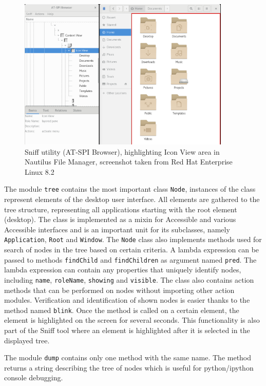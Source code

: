 \begin{figure}[h]
	\centering
	\includegraphics[width=0.9\textwidth]{obrazky-figures/sniff.png}
	\caption{Sniff utility (AT-SPI Browser), highlighting Icon View area in Nautilus File Manager, screenshot taken from Red Hat Enterprise Linux 8.2}
	\label{sniff}
\end{figure}

The module \texttt{tree} contains the most important class \texttt{Node}, instances of the class represent elements of the desktop user interface. All elements are gathered to the tree structure, representing all applications starting with the root element (desktop). The class is implemented as a mixin for Accessible and various Accessible interfaces and is an important unit for its subclasses, namely \texttt{Application}, \texttt{Root} and \texttt{Window}. The \texttt{Node} class also implements methods used for search of nodes in the tree based on certain criteria. A lambda expression can be passed to methods \texttt{findChild} and \texttt{findChildren} as argument named \texttt{pred}. The lambda expression can contain any properties that uniquely identify nodes, including \texttt{name}, \texttt{roleName},  \texttt{showing} and \texttt{visible}. The class also contains action methods that can be performed on nodes without importing other action modules. Verification and identification of shown nodes is easier thanks to the method named \texttt{blink}. Once the method is called on a certain element, the element is highlighted on the screen for several seconds. This functionality is also part of the Sniff tool where an element is highlighted after it is selected in the displayed tree.

The module \texttt{dump} contains only one method with the same name. The method returns a string describing the tree of nodes which is useful for python/ipython console debugging.

